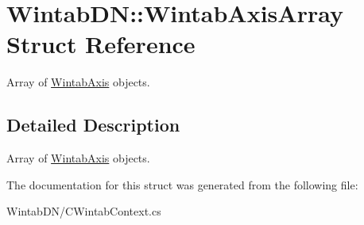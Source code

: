 \hypertarget{struct_wintab_d_n_1_1_wintab_axis_array}{
\section{WintabDN::WintabAxisArray Struct Reference}
\label{struct_wintab_d_n_1_1_wintab_axis_array}
}


Array of \hyperlink{struct_wintab_d_n_1_1_wintab_axis}{WintabAxis} objects.  




\subsection{Detailed Description}
Array of \hyperlink{struct_wintab_d_n_1_1_wintab_axis}{WintabAxis} objects. 

The documentation for this struct was generated from the following file:\begin{DoxyCompactItemize}
\item 
WintabDN/CWintabContext.cs\end{DoxyCompactItemize}
